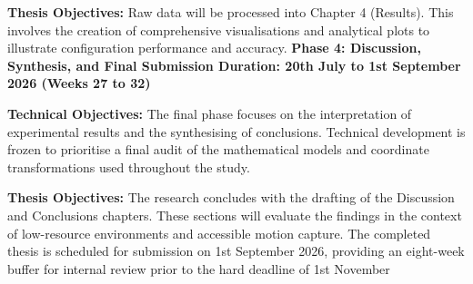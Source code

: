 \textbf{Thesis Objectives:} Raw data will be processed into Chapter 4 (Results). This involves the creation of comprehensive visualisations and analytical plots to illustrate configuration performance and accuracy.
\newline
\textbf{Phase 4: Discussion, Synthesis, and Final Submission Duration: 20th July to 1st September 2026 (Weeks 27 to 32)} 

\textbf{Technical Objectives:} The final phase focuses on the interpretation of experimental results and the synthesising of conclusions. Technical development is frozen to prioritise a final audit of the mathematical models and coordinate transformations used throughout the study. 

\textbf{Thesis Objectives:} The research concludes with the drafting of the Discussion and Conclusions chapters. These sections will evaluate the findings in the context of low-resource environments and accessible motion capture. The completed thesis is scheduled for submission on 1st September 2026, providing an eight-week buffer for internal review prior to the hard deadline of 1st November
